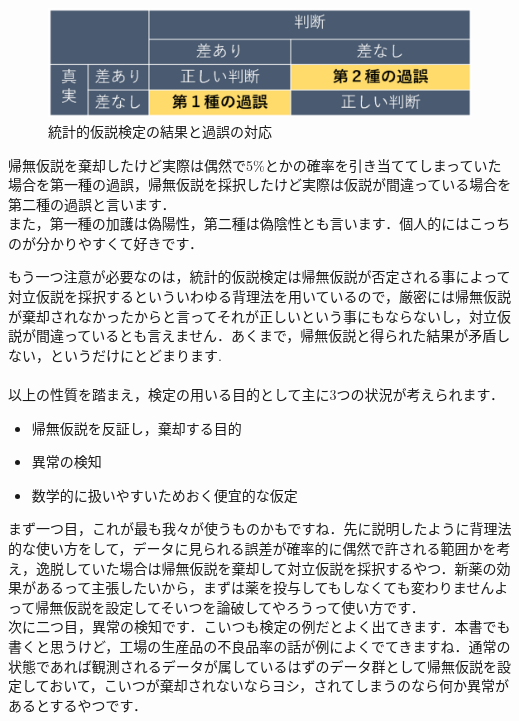 \documentclass[11pt,a4paper,uplatex]{ujreport} 	%
\begin{document}
\begin{figure}[H]
  \includegraphics[width=15cm]{../figures/miss.eps}
  \caption{統計的仮説検定の結果と過誤の対応}
\end{figure}

帰無仮説を棄却したけど実際は偶然で5\%とかの確率を引き当ててしまっていた場合を第一種の過誤，帰無仮説を採択したけど実際は仮説が間違っている場合を第二種の過誤と言います．\\

また，第一種の加護は偽陽性，第二種は偽陰性とも言います．個人的にはこっちのが分かりやすくて好きです．

もう一つ注意が必要なのは，統計的仮説検定は帰無仮説が否定される事によって対立仮説を採択するといういわゆる背理法を用いているので，厳密には帰無仮説が棄却されなかったからと言ってそれが正しいという事にもならないし，対立仮説が間違っているとも言えません．あくまで，帰無仮説と得られた結果が矛盾しない，というだけにとどまります. \\\\

以上の性質を踏まえ，検定の用いる目的として主に3つの状況が考えられます．\\

\begin{itemize}
  \item 帰無仮説を反証し，棄却する目的
  \item 異常の検知
  \item 数学的に扱いやすいためおく便宜的な仮定
\end{itemize}

まず一つ目，これが最も我々が使うものかもですね．先に説明したように背理法的な使い方をして，データに見られる誤差が確率的に偶然で許される範囲かを考え，逸脱していた場合は帰無仮説を棄却して対立仮説を採択するやつ．新薬の効果があるって主張したいから，まずは薬を投与してもしなくても変わりませんよって帰無仮説を設定してそいつを論破してやろうって使い方です．\\

次に二つ目，異常の検知です．こいつも検定の例だとよく出てきます．本書でも書くと思うけど，工場の生産品の不良品率の話が例によくでてきますね．通常の状態であれば観測されるデータが属しているはずのデータ群として帰無仮説を設定しておいて，こいつが棄却されないならヨシ，されてしまうのなら何か異常があるとするやつです．\\
\end{document}
